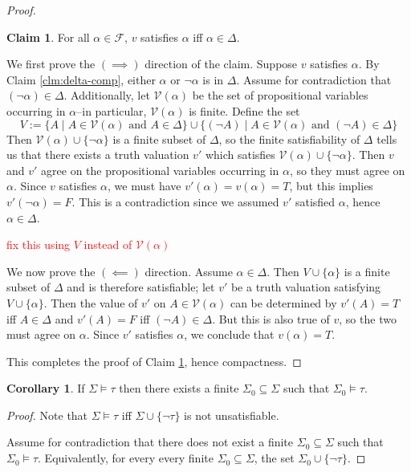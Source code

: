 \documentclass[12pt]{article}
\theoremstyle{definition}
\newtheorem{corollary}[theorem]{Corollary}
\newtheorem{claim}[theorem]{Claim}
\newcommand{\<}{\langle}
\renewcommand{\>}{\rangle}
\newcommand{\seq}{\subseteq}
\newcommand{\FF}{\mathcal{F}}
\newcommand{\VV}{\mathcal{V}}
\begin{document}
\begin{proof}
    \begin{claim}\label{clm:v-sat}
        For all $\alpha \in \FF$, $v$ satisfies $\alpha$ iff $\alpha \in \Delta$.
    \end{claim}

    We first prove the $(\implies)$ direction of the claim.
    Suppose $v$ satisfies $\alpha$.
    By Claim \ref{clm:delta-comp}, either $\alpha$ or $\lnot\alpha$ is in $\Delta$.
    Assume for contradiction that $(\lnot\alpha) \in \Delta$.
    Additionally, let $\VV(\alpha)$ be the set of propositional variables occurring in $\alpha$--in particular, $\VV(\alpha)$ is finite.
    Define the set
    \[
        V := \{A \mid A \in\VV(\alpha) \text{ and } A \in \Delta\}
            \cup \{(\lnot A) \mid A \in \VV(\alpha) \text{ and } (\lnot A) \in \Delta\}  
    \]
    Then $\VV(\alpha) \cup \{\lnot\alpha\}$ is a finite subset of $\Delta$, so the finite satisfiability of $\Delta$ tells us that there exists a truth valuation $v'$ which satisfies $\VV(\alpha) \cup \{\lnot\alpha\}$.
    Then $v$ and $v'$ agree on the propositional variables occurring in $\alpha$, so they must agree on $\alpha$.
    Since $v$ satisfies $\alpha$, we must have $v'(\alpha) = v(\alpha) = T$, but this implies $v'(\lnot\alpha) = F$.
    This is a contradiction since we assumed $v'$ satisfied $\alpha$, hence $\alpha \in \Delta$.

    \textcolor{red}{fix this using $V$ instead of $\VV(\alpha)$}
    
    We now prove the $(\impliedby)$ direction.
    Assume $\alpha \in \Delta$.
    Then $V \cup \{\alpha\}$ is a finite subset of $\Delta$ and is therefore satisfiable; let $v'$ be a truth valuation satisfying $V \cup \{\alpha\}$.
    Then the value of $v'$ on $A \in \VV(\alpha)$ can be determined by $v'(A) = T$ iff $A \in \Delta$ and $v'(A) = F$ iff $(\lnot A) \in \Delta$.
    But this is also true of $v$, so the two must agree on $\alpha$.
    Since $v'$ satisfies $\alpha$, we conclude that $v(\alpha) = T$.

    This completes the proof of Claim \ref{clm:v-sat}, hence compactness.
\end{proof}


\begin{corollary}
    If $\Sigma \vDash \tau$ then there exists a finite $\Sigma_0 \seq \Sigma$ such that $\Sigma_0 \vDash \tau$.
\end{corollary}

\begin{proof}
    Note that $\Sigma \vDash \tau$ iff $\Sigma \cup \{\lnot\tau\}$ is not unsatisfiable.

    Assume for contradiction that there does not exist a finite $\Sigma_0 \seq \Sigma$ such that $\Sigma_0 \vDash \tau$.
    Equivalently, for every every finite $\Sigma_0 \seq \Sigma$, the set $\Sigma_0 \cup \{\lnot\tau\}$.
\end{proof}
\end{document}
